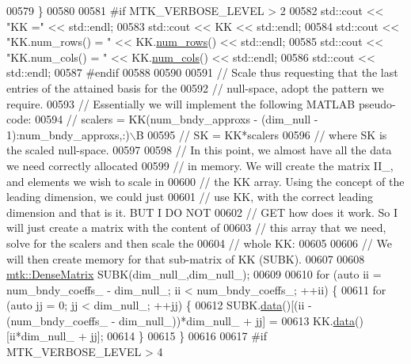 \begin{DoxyCode}
{{00579   \}
00580 
00581 \textcolor{preprocessor}{  #if MTK\_VERBOSE\_LEVEL > 2}
00582   std::cout << \textcolor{stringliteral}{"KK ="} << std::endl;
00583   std::cout << KK << std::endl;
00584   std::cout << \textcolor{stringliteral}{"KK.num\_rows() = "} << KK.\hyperlink{classmtk_1_1DenseMatrix_a53f3afb3b6a8d21854458aaa9663cc74}{num\_rows}() << std::endl;
00585   std::cout << \textcolor{stringliteral}{"KK.num\_cols() = "} << KK.\hyperlink{classmtk_1_1DenseMatrix_a41747502d468c6728a4be31501b16e0e}{num\_cols}() << std::endl;
00586   std::cout << std::endl;
00587 \textcolor{preprocessor}{  #endif}
00588 
00590 
00591   \textcolor{comment}{// Scale thus requesting that the last entries of the attained basis for the}
00592   \textcolor{comment}{// null-space, adopt the pattern we require.}
00593   \textcolor{comment}{// Essentially we will implement the following MATLAB pseudo-code:}
00594   \textcolor{comment}{//  scalers = KK(num\_bndy\_approxs - (dim\_null - 1):num\_bndy\_approxs,:)\(\backslash\)B}
00595   \textcolor{comment}{//  SK = KK*scalers}
00596   \textcolor{comment}{// where SK is the scaled null-space.}
00597 
00598   \textcolor{comment}{// In this point, we almost have all the data we need correctly allocated}
00599   \textcolor{comment}{// in memory. We will create the matrix II\_, and elements we wish to scale in}
00600   \textcolor{comment}{// the KK array. Using the concept of the leading dimension, we could just}
00601   \textcolor{comment}{// use KK, with the correct leading dimension and that is it. BUT I DO NOT}
00602   \textcolor{comment}{// GET how does it work. So I will just create a matrix with the content of}
00603   \textcolor{comment}{// this array that we need, solve for the scalers and then scale the}
00604   \textcolor{comment}{// whole KK:}
00605 
00606   \textcolor{comment}{// We will then create memory for that sub-matrix of KK (SUBK).}
00607 
00608   \hyperlink{classmtk_1_1DenseMatrix}{mtk::DenseMatrix} SUBK(dim\_null\_,dim\_null\_);
00609 
00610   \textcolor{keywordflow}{for} (\textcolor{keyword}{auto} ii = num\_bndy\_coeffs\_ - dim\_null\_; ii < num\_bndy\_coeffs\_; ++ii) \{
00611     \textcolor{keywordflow}{for} (\textcolor{keyword}{auto} jj = 0; jj < dim\_null\_; ++jj) \{
00612       SUBK.\hyperlink{classmtk_1_1DenseMatrix_a0c33b8a9e01d157c61ddbdf807c25d84}{data}()[(ii - (num\_bndy\_coeffs\_ - dim\_null\_))*dim\_null\_ + jj] =
00613           KK.\hyperlink{classmtk_1_1DenseMatrix_a0c33b8a9e01d157c61ddbdf807c25d84}{data}()[ii*dim\_null\_ + jj];
00614     \}
00615   \}
00616 
00617 \textcolor{preprocessor}{  #if MTK\_VERBOSE\_LEVEL > 4}
}}
\end{DoxyCode}
